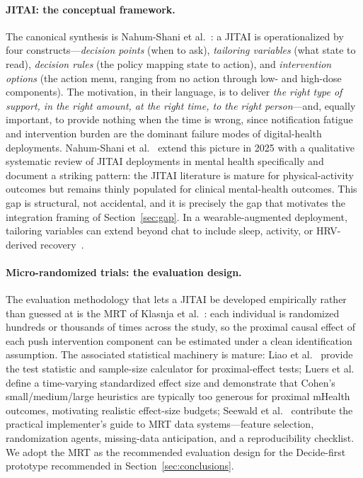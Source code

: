 \documentclass[11pt,a4paper]{article}
\newcommand{\secref}[1]{Section~\ref{#1}}
\begin{document}
\paragraph{JITAI: the conceptual framework.}
The canonical synthesis is Nahum-Shani et
al.~\cite{NahumShani2018JITAI}: a JITAI is operationalized by four
constructs---\emph{decision points} (when to ask),
\emph{tailoring variables} (what state to read),
\emph{decision rules} (the policy mapping state to action), and
\emph{intervention options} (the action menu, ranging from no
action through low- and high-dose components). The motivation, in
their language, is to deliver \emph{the right type of support, in
the right amount, at the right time, to the right person}---and,
equally important, to provide nothing when the time is wrong, since
notification fatigue and intervention burden are the dominant
failure modes of digital-health deployments. Nahum-Shani et
al.~\cite{NahumShani2025JITAIMHReview} extend this picture in 2025
with a qualitative systematic review of JITAI deployments in mental
health specifically and document a striking pattern: the JITAI
literature is mature for physical-activity outcomes but remains
thinly populated for clinical mental-health outcomes. This gap is
structural, not accidental, and it is precisely the gap that
motivates the integration framing of \secref{sec:gap}. In a
wearable-augmented deployment, tailoring variables can extend
beyond chat to include sleep, activity, or HRV-derived
recovery~\cite{Sequeira2021PassiveSensing,Laborde2017HRV}.

\paragraph{Micro-randomized trials: the evaluation design.}
The evaluation methodology that lets a JITAI be developed
empirically rather than guessed at is the MRT of Klasnja et
al.~\cite{Klasnja2015MRT}: each individual is randomized hundreds
or thousands of times across the study, so the proximal causal
effect of each push intervention component can be estimated under a
clean identification assumption. The associated statistical
machinery is mature: Liao et al.~\cite{Liao2016MRTSampleSize}
provide the test statistic and sample-size calculator for
proximal-effect tests; Luers et al.~\cite{Luers2018StandardizedEffect}
define a time-varying standardized effect size and demonstrate that
Cohen's small/medium/large heuristics are typically too generous
for proximal mHealth outcomes, motivating realistic effect-size
budgets; Seewald et al.~\cite{Seewald2019MRTData} contribute the
practical implementer's guide to MRT data systems---feature
selection, randomization agents, missing-data anticipation, and a
reproducibility checklist. We adopt the MRT as the recommended
evaluation design for the Decide-first prototype recommended in
\secref{sec:conclusions}.
\end{document}

